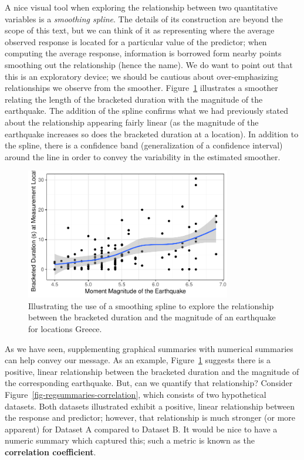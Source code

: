 \documentclass[
  letterpaper,
  DIV=11,
  numbers=noendperiod]{scrreprt}
\theoremstyle{plain}
\theoremstyle{definition}
\theoremstyle{definition}
\theoremstyle{remark}
\begin{document}
A nice visual tool when exploring the relationship between two
quantitative variables is a \emph{smoothing spline}. The details of its
construction are beyond the scope of this text, but we can think of it
as representing where the average observed response is located for a
particular value of the predictor; when computing the average response,
information is borrowed form nearby points smoothing out the
relationship (hence the name). We do want to point out that this is an
exploratory device; we should be cautious about over-emphasizing
relationships we observe from the smoother.
Figure~\ref{fig-regsummaries-spline} illustrates a smoother relating the
length of the bracketed duration with the magnitude of the earthquake.
The addition of the spline confirms what we had previously stated about
the relationship appearing fairly linear (as the magnitude of the
earthquake increases so does the bracketed duration at a location). In
addition to the spline, there is a confidence band (generalization of a
confidence interval) around the line in order to convey the variability
in the estimated smoother.

\begin{figure}

{\centering \includegraphics[width=0.8\textwidth,height=\textheight]{./images/fig-regsummaries-spline-1.pdf}

}

\caption{\label{fig-regsummaries-spline}Illustrating the use of a
smoothing spline to explore the relationship between the bracketed
duration and the magnitude of an earthquake for locations Greece.}

\end{figure}

As we have seen, supplementing graphical summaries with numerical
summaries can help convey our message. As an example,
Figure~\ref{fig-regsummaries-spline} suggests there is a positive,
linear relationship between the bracketed duration and the magnitude of
the corresponding earthquake. But, can we quantify that relationship?
Consider Figure~\ref{fig-regsummaries-correlation}, which consists of
two hypothetical datasets. Both datasets illustrated exhibit a positive,
linear relationship between the response and predictor; however, that
relationship is much stronger (or more apparent) for Dataset A compared
to Dataset B. It would be nice to have a numeric summary which captured
this; such a metric is known as the \textbf{correlation coefficient}.
\end{document}
